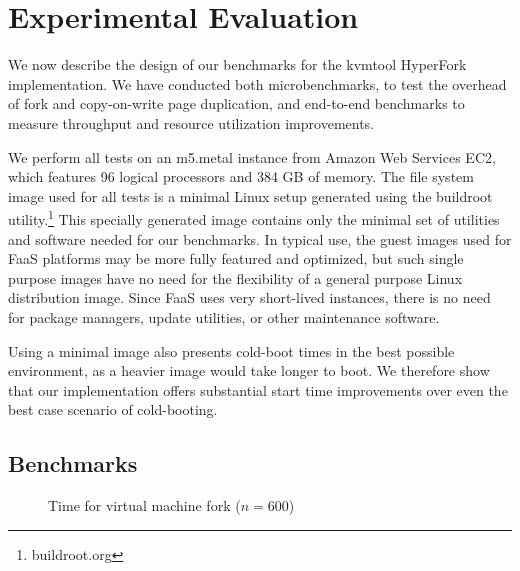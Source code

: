 \section{Experimental Evaluation} \label{sec:experiments} We now describe the
design of our benchmarks for the kvmtool HyperFork implementation. We have
conducted both microbenchmarks, to test the overhead of fork and copy-on-write
page duplication, and end-to-end benchmarks to measure throughput and resource
utilization improvements.


We perform all tests on an m5.metal instance from Amazon Web Services EC2,
which features 96 logical processors and 384 GB of memory. The file system
image used for all tests is a minimal Linux setup generated using the buildroot
utility.\footnote{buildroot.org} This specially generated image contains only
the minimal set of utilities and software needed for our benchmarks. In typical
use, the guest images used for FaaS platforms may be more fully featured and
optimized, but such single purpose images have no need for the flexibility of a
general purpose Linux distribution image. Since FaaS uses very short-lived
instances, there is no need for package managers, update utilities, or other
maintenance software.

Using a minimal image also presents cold-boot times in the best possible
environment, as a heavier image would take longer to boot. We therefore show
that our implementation offers substantial start time improvements over even
the best case scenario of cold-booting.

\subsection{Benchmarks}

\begin{figure}[t]


  \caption{Time for virtual machine fork ($n = 600$)}
  \label{fig:fork-time}
\end{figure}

